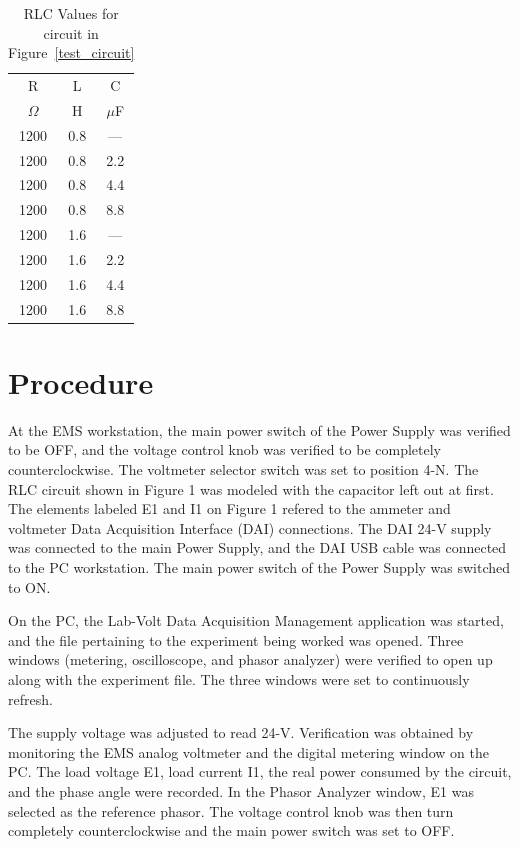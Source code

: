 \documentclass{article}
\begin{document}
\begin{table}[h]
  \begin{center}
    \begin{tabular}{ccc}
      \hline
      R & L & C \\
      $\Omega$ & H & $\mu$F \\
      \hline
      1200 & 0.8 & --- \\ 1200 & 0.8 & 2.2 \\ 1200 & 0.8 & 4.4 \\
      1200 & 0.8 & 8.8 \\ 1200 & 1.6 & --- \\ 1200 & 1.6 & 2.2 \\
      1200 & 1.6 & 4.4 \\ 1200 & 1.6 & 8.8 \\
      \hline
    \end{tabular}
    \caption{RLC Values for circuit in Figure~\ref{test_circuit}}
    \label{testc_dat}
  \end{center}
\end{table}

\section{Procedure}
At the EMS workstation, the main power switch of the Power Supply was 
verified to be OFF, and the voltage control knob was verified to be 
completely counterclockwise. The voltmeter selector switch was set to
position 4-N. The RLC circuit shown in Figure 1 was modeled with the 
capacitor left out at first. The elements labeled E1 and I1 on Figure 1
refered to the ammeter and voltmeter Data Acquisition Interface (DAI)
connections. The DAI 24-V supply was connected to the main Power Supply,
and the DAI USB cable was connected to the PC workstation. The main power
switch of the Power Supply was switched to ON.

On the PC, the Lab-Volt Data Acquisition Management application was
started, and the file pertaining to the experiment being worked was 
opened. Three windows (metering, oscilloscope, and phasor analyzer)
were verified to open up along with the experiment file. The three 
windows were set to continuously refresh.

The supply voltage was adjusted to read 24-V. Verification was obtained
by monitoring the EMS analog voltmeter and the digital metering window
on the PC. The load voltage E1, load current I1, the real power consumed 
by the circuit, and the phase angle were recorded. In the Phasor Analyzer
window, E1 was selected as the reference phasor. The voltage control knob 
was then turn completely counterclockwise and the main power switch was 
set to OFF.
\end{document}
